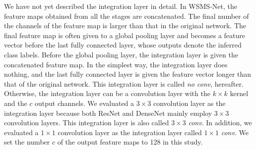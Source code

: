 \documentclass[journal]{IEEEtran}
\begin{document}
We have not yet described the integration layer in detail.
In WSMS-Net, the feature maps obtained from all the stages are concatenated.
The final number of the channels of the feature map is larger than that in the original network.
The final feature map is often given to a global pooling layer and becomes a feature vector before the last fully connected layer, whose outputs denote the inferred class labels.
Before the global pooling layer, the integration layer is given the concatenated feature map.
In the simplest way, the integration layer does nothing, and the last fully connected layer is given the feature vector longer than that of the original network.
This integration layer is called \emph{no conv}, hereafter.
Otherwise, the integration layer can be a convolution layer with the $k\times k$ kernel and the $c$ output channels.
We evaluated a $3\times 3$ convolution layer as the integration layer because both ResNet and DenseNet mainly employ $3\times 3$ convolution layers.
This integration layer is also called $3\times 3$ \emph{conv}.
In addition, we evaluated a $1\times 1$ convolution layer as the integration layer called $1\times 1$ \emph{conv}.
We set the number $c$ of the output feature maps to 128 in this study.
\end{document}
